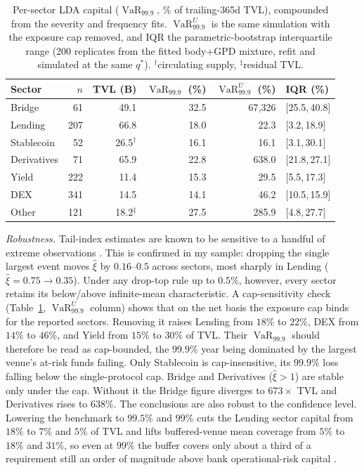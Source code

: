 \documentclass[runningheads]{llncs}
\newcommand{\VaR}{\operatorname{VaR}}
\begin{document}
\begin{table}[tb]
\centering
\caption{Per-sector LDA capital ($\VaR_{99.9}$, \% of trailing-365d TVL),
compounded from the severity and frequency fits. $\VaR_{99.9}^U$ is the same simulation with the exposure cap removed, and IQR
the parametric-bootstrap interquartile range (200 replicates from the fitted
body+GPD mixture, refit and simulated at the same $q^*$).
$^\dagger$circulating supply, $^\ddagger$residual TVL.}
\label{tab:lda-sector}
\small
\begin{tabular}{l r r r r l}
\toprule
Sector & $n$ & TVL (B) & $\VaR_{99.9}$ (\%) & $\VaR_{99.9}^U$ (\%) & IQR (\%) \\
\midrule
Bridge       &  61 &  49.1  & 32.5 & 67{,}326 & [25.5,\,40.8] \\
Lending      & 207 &  66.8  & 18.0 & 22.3 & [3.2,\,18.9] \\
Stablecoin   &  52 & 26.5$^\dagger$ & 16.1 & 16.1 & [3.1,\,30.1] \\
Derivatives  &  71 &  65.9  & 22.8 & 638.0 & [21.8,\,27.1] \\
Yield        & 222 &  11.4  & 15.3 & 29.5 & [5.5,\,17.3] \\
DEX          & 341 &  14.5  & 14.1 & 46.2 & [10.5,\,15.9] \\
Other        & 121 &  18.2$^\ddagger$ & 27.5 & 285.9 & [4.8,\,27.7] \\
\bottomrule
\end{tabular}
\end{table}

\emph{Robustness.} Tail-index estimates are known to be sensitive to a handful of extreme
observations \citep{EmbrechtsKM1997}. This is confirmed in my sample: dropping the single largest event
moves $\hat\xi$ by $0.16$--$0.5$ across sectors, most sharply in Lending
($\hat\xi=0.75 \to 0.35$). Under any drop-top rule up to $0.5\%$, however,
every sector retains its below/above infinite-mean characteristic. A cap-sensitivity check
(Table~\ref{tab:lda-sector}, $\VaR_{99.9}^U$ column) shows that on the
net basis the exposure cap binds for the reported sectors. Removing it
raises Lending from $18\%$ to $22\%$, DEX from $14\%$ to $46\%$, and
Yield from $15\%$ to $30\%$ of TVL. Their $\VaR_{99.9}$ should therefore
be read as cap-bounded, the $99.9\%$ year being dominated by the
largest venue's at-risk funds failing. Only Stablecoin is cap-insensitive, its $99.9\%$ loss
falling below the single-protocol cap. Bridge
and Derivatives ($\hat\xi>1$) are stable only under the cap. Without it
the Bridge figure diverges to $673\times$ TVL and Derivatives rises to
$638\%$. The conclusions are also robust to the
confidence level. Lowering the benchmark to $99.5\%$ and $99\%$ cuts the
Lending sector capital from $18\%$ to $7\%$ and $5\%$ of TVL and lifts
buffered-venue mean coverage from $5\%$ to $18\%$ and $31\%$, so even at
$99\%$ the buffer covers only about a third of a requirement still an
order of magnitude above bank operational-risk capital \citep{Fontnouvelle2006}.
\end{document}
